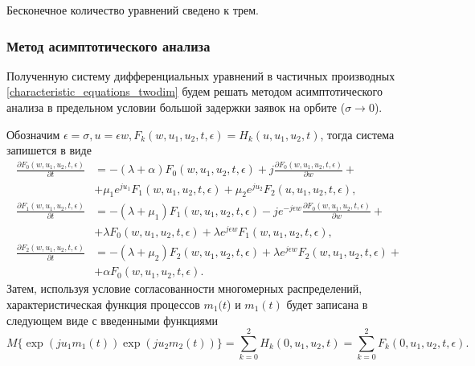 Бесконечное количество уравнений сведено к трем.

\subsubsection{Метод асимптотического анализа}
Полученную систему дифференциальных уравнений в частичных производных  \eqref{characteristic_equations_twodim} будем решать методом асимптотического анализа в предельном условии большой задержки заявок на орбите ($\sigma \xrightarrow{} 0$).

Обозначим $\epsilon = \sigma,   u= \epsilon w,   F_{k}(w,u_{1},u_{2},t,\epsilon) = H_{k}(u,u_{1},u_{2},t)$, тогда система запишется в виде
\begin{equation} \label{asymptotic_equations_twodim}
	\begin{split}
		\frac{{\partial F_{0}(w,u_{1},u_{2},t,\epsilon)}}{{\partial t}} &= -(\lambda + \alpha)F_{0}(w,u_{1},u_{2},t,\epsilon) + j
		\frac{{\partial F_{0}(w,u_{1},u_{2},t,\epsilon)}}{{\partial w}} +\\  &+ \mu_{1} e^{ju_{1}}F_{1}(w,u_{1},u_{2},t,\epsilon) + \mu_{2}e^{ju_{2}}F_{2}(u,u_{1},u_{2},t,\epsilon) ,
		\\
		\frac{{\partial F_{1}(w,u_{1},u_{2},t,\epsilon)}}{{\partial t}} &= -(\lambda + \mu_{1})F_{1}(w,u_{1},u_{2},t,\epsilon) - j e^{-j\epsilon w}
		\frac{{\partial F_{0}(w,u_{1},u_{2},t,\epsilon)}}{{\partial w}} +\\  &+ \lambda F_{0}(w,u_{1},u_{2},t,\epsilon) + \lambda e^{j\epsilon w}F_{1}(w,u_{1},u_{2},t,\epsilon) ,
		\\
		\frac{{\partial F_{2}(w,u_{1},u_{2},t,\epsilon)}}{{\partial t}} &= -(\lambda + \mu_{2})F_{2}(w,u_{1},u_{2},t,\epsilon)  + \lambda e^{j\epsilon w}F_{2}(w,u_{1},u_{2},t,\epsilon) +\\  &+ \alpha F_{0}(w,u_{1},u_{2},t,\epsilon).
	\end{split}
\end{equation} 
Затем, используя условие согласованности многомерных распределений, характеристическая функция процессов $m_{1}(t$) и $m_{1}(t)$ будет записана в следующем виде с введенными функциями 
\begin{equation*}
	M\{\exp(ju_{1}m_{1}(t))\exp(ju_{2}m_{2}(t))\}=\sum_{k=0}^{2}H_{k}(0,u_{1},u_{2},t) = \sum_{k=0}^{2}F_{k}(0,u_{1},u_{2},t,\epsilon).
\end{equation*}

